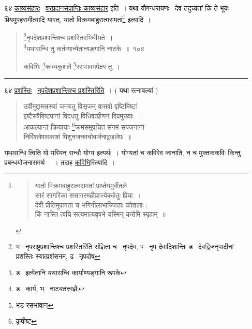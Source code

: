 \documentclass[11pt, openany]{book}
\begin{document}
६४ \underline{काव्यसंहारः} \textendash\ \underline{वरप्रदानसंप्राप्तिः काव्यसंहार} इति~। यथा यौगन्धरायणः \textendash\ देव तदुच्यतां किं ते भूयः प्रियमुपहरामीत्यादि यावत्, {\qt यातो विक्रमबाहुरात्मसमतां\renewcommand{\thefootnote}{$\dagger$}\footnote{\begin{quote}
{\qt यातो विक्रमबाहुरात्मसमतां प्राप्तेयमुर्वीतले\\
सारं सागरिका ससागरमहीप्राप्त्येकहेतुः प्रिया~।\\
देवी प्रीतिमुपागता च भगिनीलाभाज्जिताः कोशलाः ;\\
किं नास्ति त्वयि सत्यमात्यवृषभे यस्मिन् करोमि स्पृहाम्~॥}
\end{quote}}} इत्यादि~।

\newpage

\begin{quote}
{\na \renewcommand{\thefootnote}{1}\footnote{भ \textendash\ नृपराष्ट्रप्रशान्तिश्च प्रशस्तिरिति संज्ञिता च \textendash\ नृपदेव, प \textendash\ नृप देवादिशान्तिः ड \textendash\ देवद्विजनृपादीनां प्रशस्तिः स्यात्प्रशंसनम्, ढ \textendash\ नृपदोष}नृपदेशप्रशान्तिश्च प्रशस्तिरभिधीयते~।\\
\renewcommand{\thefootnote}{2}\footnote{ड \textendash\ इत्येतानि यथासन्धि कार्याण्यङ्गानि रूपके}यथासन्धि तु कर्तव्यान्येतान्यङ्गानि नाटके~॥~१०४

कविभिः \renewcommand{\thefootnote}{3}\footnote{ड \textendash\ कार्य, भ \textendash\ नाट्यतत्त्वज्ञैः}काव्यकुशलै \renewcommand{\thefootnote}{4}\footnote{भड रसभावान्}रसभावमपेक्ष्य तु~।}
\end{quote}

\hrule

\vspace{2mm}
६४ \underline{प्रशस्तिः} \textendash\ \underline{नृपदेशप्रशान्तिश्च प्रशस्तिरिति}~। ( यथा रत्नावल्यां ) \textendash

\begin{quote}
{\qt उर्वीमुद्दामसस्यां जनयतु विसृजन् वासवो वृष्टिमिष्टां\\
इष्टैस्त्रैविष्टपानां विदधतु विधिवत्प्रीणनं विप्रमुख्याः~।\\
आकल्पान्तं क्रियायाः \renewcommand{\thefootnote}{*}\footnote{कृषीष्ट}क्रमसमुपचितं संगमं सज्जनानां\\
निर्विश्लेषावकाशं पिशुनजनवचोवर्जनाद्वज्रलेपः~॥}
\end{quote}

\underline{यथासन्धि त्विति} यो यस्मिन् सन्धौ योग्य इत्यर्थः~। योग्यतां च कविरेव जानाति, न च मुक्तककविः किन्तु प्रबन्धयोजनासमर्थ \textendash\ ~। तदाह \underline{कविभि}रित्यादि~।\\
\end{document}

